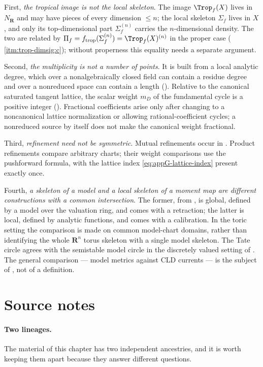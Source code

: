 First, \emph{the tropical image is not the local skeleton}. The image
$\Trop_f(X)$ lives in $N_{\mathbf R}$ and may have pieces of every dimension
$\le n$; the local skeleton $\Sigma_f$ lives in $X$, and only its
top-dimensional part $\Sigma_f^{(n)}$ carries the $n$-dimensional density.
The two are
related by $\Pi_f=f_{\mathrm{trop}}(\Sigma_f^{(n)})=\Trop_f(X)^{(n)}$ in the
proper case ( \cref{itm:trop-dimsig:c});
without properness this equality needs a separate argument.

Second, \emph{the multiplicity is not a number of points}. It is built from
a local analytic degree, which over a nonalgebraically closed field can
contain a residue degree and over a nonreduced space can contain a length
(). Relative to the
canonical saturated tangent lattice, the scalar weight $m_D$ of the
fundamental cycle is a positive integer
(). Fractional coefficients arise only after
changing to a noncanonical lattice normalization or allowing
rational-coefficient cycles; a nonreduced source by itself does not make the
canonical weight fractional.

Third, \emph{refinement need not be symmetric}. Mutual refinements occur
in . Product refinements compare arbitrary charts;
their weight comparisons use the pushforward formula, with the lattice
index \eqref{eq:appG-lattice-index} present exactly once.

Fourth, \emph{a skeleton of a model and a local skeleton of a moment map are
different constructions with a common intersection}. The former, from
, is global, defined by a model over the valuation ring,
and comes with a retraction; the latter is local, defined by analytic
functions, and comes with a calibration. In the toric setting the
comparison is made on common model-chart domains, rather than identifying
the whole $\mathbf R^n$ torus skeleton with a single model skeleton. The
Tate circle agrees with the semistable model circle in the discretely
valued setting of . The general
comparison --- model metrics against CLD currents --- is the subject of
, not of a definition.

\section*{Source notes}

\paragraph{Two lineages.}
The material of this chapter has two independent ancestries, and it is worth
keeping them apart because they answer different questions.

